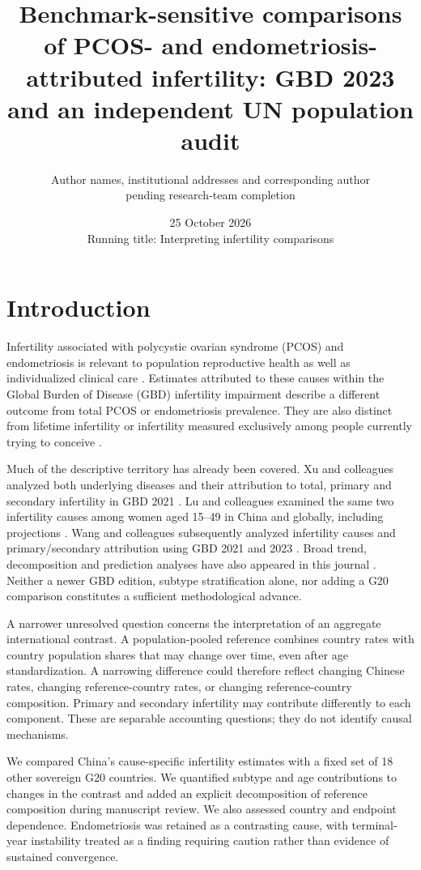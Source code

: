 \documentclass[11pt,a4paper]{article}
\title{Benchmark-sensitive comparisons of PCOS- and endometriosis-attributed infertility: GBD 2023 and an independent UN population audit}
\author{\parbox{0.9\textwidth}{\centering Author names, institutional addresses and corresponding author\\pending research-team completion}}
\date{25 October 2026\\{\small Running title: Interpreting infertility comparisons}}
\begin{document}
\maketitle
\linenumbers

\section{Introduction}
Infertility associated with polycystic ovarian syndrome (PCOS) and endometriosis is relevant to population reproductive health as well as individualized clinical care \cite{pcos,eshre}. Estimates attributed to these causes within the Global Burden of Disease (GBD) infertility impairment describe a different outcome from total PCOS or endometriosis prevalence. They are also distinct from lifetime infertility or infertility measured exclusively among people currently trying to conceive \cite{gbd}.

Much of the descriptive territory has already been covered. Xu and colleagues analyzed both underlying diseases and their attribution to total, primary and secondary infertility in GBD 2021 \cite{xu}. Lu and colleagues examined the same two infertility causes among women aged 15--49 in China and globally, including projections \cite{lu}. Wang and colleagues subsequently analyzed infertility causes and primary/secondary attribution using GBD 2021 and 2023 \cite{wang}. Broad trend, decomposition and prediction analyses have also appeared in this journal \cite{feng}. Neither a newer GBD edition, subtype stratification alone, nor adding a G20 comparison constitutes a sufficient methodological advance.

A narrower unresolved question concerns the interpretation of an aggregate international contrast. A population-pooled reference combines country rates with country population shares that may change over time, even after age standardization. A narrowing difference could therefore reflect changing Chinese rates, changing reference-country rates, or changing reference-country composition. Primary and secondary infertility may contribute differently to each component. These are separable accounting questions; they do not identify causal mechanisms.

We compared China's cause-specific infertility estimates with a fixed set of 18 other sovereign G20 countries. We quantified subtype and age contributions to changes in the contrast and added an explicit decomposition of reference composition during manuscript review. We also assessed country and endpoint dependence. Endometriosis was retained as a contrasting cause, with terminal-year instability treated as a finding requiring caution rather than evidence of sustained convergence.
\end{document}
